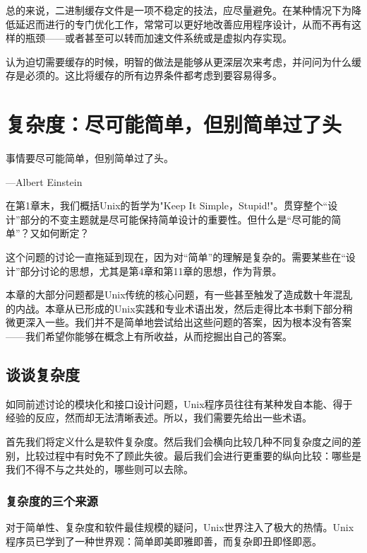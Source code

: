 \documentclass[12pt,oneside]{book}
\begin{document}
\begin{common-format}
总的来说，二进制缓存文件是一项不稳定的技法，应尽量避免。在某种情况下为降低延迟而进行的专门优化工作，常常可以更好地改善应用程序设计，从而不再有这样的瓶颈——或者甚至可以转而加速文件系统或是虚拟内存实现。

认为迫切需要缓存的时候，明智的做法是能够从更深层次来考虑，并问问为什么缓存是必须的。这比将缓存的所有边界条件都考虑到要容易得多。



\chapter{复杂度：尽可能简单，但别简单过了头}
\begin{flushright}
\begin{notecard}{15em}
事情要尽可能简单，但别简单过了头。

{\hfill —Albert Einstein}
\end{notecard}
\end{flushright}

在第1章末，我们概括Unix的哲学为"Keep It Simple，Stupid!"。贯穿整个“设计”部分的不变主题就是尽可能保持简单设计的重要性。但什么是“尽可能的简单”？又如何断定？

这个问题的讨论一直拖延到现在，因为对“简单”的理解是复杂的。需要某些在“设计”部分讨论的思想，尤其是第4章和第11章的思想，作为背景。

本章的大部分问题都是Unix传统的核心问题，有一些甚至触发了造成数十年混乱的内战。本章从已形成的Unix实践和专业术语出发，然后走得比本书剩下部分稍微更深入一些。我们并不是简单地尝试给出这些问题的答案，因为根本没有答案——我们希望你能够在概念上有所收益，从而挖掘出自己的答案。


\section{谈谈复杂度}
如同前述讨论的模块化和接口设计问题，Unix程序员往往有某种发自本能、得于经验的反应，然而却无法清晰表述。所以，我们需要先给出一些术语。

首先我们将定义什么是软件复杂度。然后我们会横向比较几种不同复杂度之间的差别，比较过程中有时免不了顾此失彼。最后我们会进行更重要的纵向比较：哪些是我们不得不与之共处的，哪些则可以去除。

\subsection{复杂度的三个来源}
对于简单性、复杂度和软件最佳规模的疑问，Unix世界注入了极大的热情。Unix程序员已学到了一种世界观：简单即美即雅即善，而复杂即丑即怪即恶。


\end{common-format}
\end{document}
